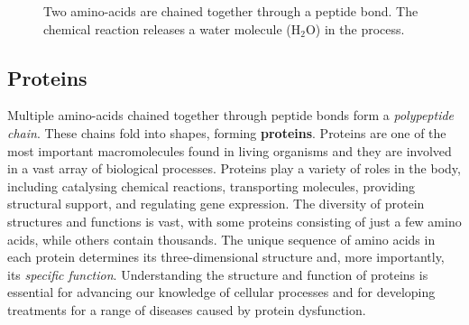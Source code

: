 \begin{figure}
    \centering
    \caption{Two amino-acids are chained together through a peptide bond. The chemical reaction releases a water molecule ($\text{H}_2\text{O}$) in the process.}
    \label{fig:residue}
\end{figure}

\subsection{Proteins}
Multiple amino-acids chained together through peptide bonds form a \textit{polypeptide chain}.
These chains fold into shapes, forming \textbf{proteins}. 
Proteins are one of the most important macromolecules found in living organisms and they are involved in a vast array of biological processes. 
Proteins play a variety of roles in the body, including catalysing chemical reactions, transporting molecules, providing structural support, and regulating gene expression. 
The diversity of protein structures and functions is vast, with some proteins consisting of just a few amino acids, while others contain thousands. 
The unique sequence of amino acids in each protein determines its three-dimensional structure and, more importantly, its \textit{specific function}. 
Understanding the structure and function of proteins is essential for advancing our knowledge of cellular processes and for developing treatments for a range of diseases caused by protein dysfunction.

